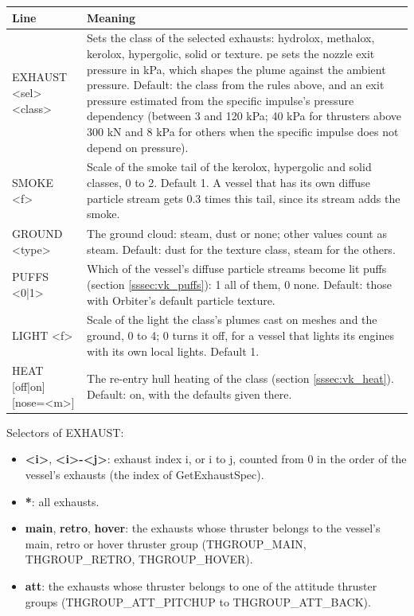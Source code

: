 \documentclass[Orbiter Developer Manual.tex]{subfiles}
\begin{document}
\begin{sloppypar}
	\begin{longtable}{ |>{\raggedright\arraybackslash}p{}|p{}| }
	\hline\rule{0pt}{2ex}
	\textbf{Line} & \textbf{Meaning}\\
	\hline\rule{0pt}{2ex}
	EXHAUST <sel> <class>\newline [pe=<p>] & Sets the class of the selected exhausts: hydrolox, methalox, kerolox, hypergolic, solid or texture. pe sets the nozzle exit pressure in kPa, which shapes the plume against the ambient pressure. Default: the class from the rules above, and an exit pressure estimated from the specific impulse's pressure dependency (between 3 and 120 kPa; 40 kPa for thrusters above 300 kN and 8 kPa for others when the specific impulse does not depend on pressure).\\
	\hline\rule{0pt}{2ex}
	SMOKE <f> & Scale of the smoke tail of the kerolox, hypergolic and solid classes, 0 to 2. Default 1. A vessel that has its own diffuse particle stream gets 0.3 times this tail, since its stream adds the smoke.\\
	\hline\rule{0pt}{2ex}
	GROUND <type> & The ground cloud: steam, dust or none; other values count as steam. Default: dust for the texture class, steam for the others.\\
	\hline\rule{0pt}{2ex}
	PUFFS <0|1> & Which of the vessel's diffuse particle streams become lit puffs (section \ref{sssec:vk_puffs}): 1 all of them, 0 none. Default: those with Orbiter's default particle texture.\\
	\hline\rule{0pt}{2ex}
	LIGHT <f> & Scale of the light the class's plumes cast on meshes and the ground, 0 to 4; 0 turns it off, for a vessel that lights its engines with its own local lights. Default 1.\\
	\hline\rule{0pt}{2ex}
	HEAT [off|on] [nose=<m>]\newline [emis=<e>] [lag=<s>]\newline [glow=<g>] & The re-entry hull heating of the class (section \ref{sssec:vk_heat}). Default: on, with the defaults given there.\\
	\hline
	\end{longtable}

\noindent
Selectors of EXHAUST:

\begin{itemize}
\item \textbf{<i>}, \textbf{<i>-<j>}: exhaust index i, or i to j, counted from 0 in the order of the vessel's exhausts (the index of GetExhaustSpec).
\item \textbf{*}: all exhausts.
\item \textbf{main}, \textbf{retro}, \textbf{hover}: the exhausts whose thruster belongs to the vessel's main, retro or hover thruster group (THGROUP\_MAIN, THGROUP\_RETRO, THGROUP\_HOVER).
\item \textbf{att}: the exhausts whose thruster belongs to one of the attitude thruster groups (THGROUP\_\allowbreak ATT\_\allowbreak PITCHUP to THGROUP\_\allowbreak ATT\_\allowbreak BACK).
\end{itemize}


\end{sloppypar}
\end{document}
